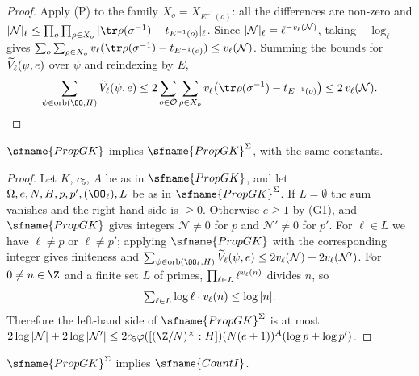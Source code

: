 \begin{proof}
Apply (P) to the family $X_o=X_{E^{-1}(o)}$: all the differences are non-zero and
$|\mathcal N|_\ell\le\prod_o\prod_{\rho\in X_o}|\tr\rho(\sigma^{-1})-t_{E^{-1}(o)}|_\ell$. Since $|\mathcal N|_\ell=\ell^{-v_\ell(\mathcal N)}$, taking
$-\log_\ell$ gives $\sum_o\sum_{\rho\in X_o}\eisv(\tr\rho(\sigma^{-1})-t_{E^{-1}(o)})\le\eisv(\mathcal N)$. Summing the bounds for
$\widetilde V_\ell(\psi,e)$ over $\psi$ and reindexing by $E$,
\[
 \sum_{\psi\in\mathrm{orb}(\OO,H)}\eisVt_\ell(\psi,e)\le2\sum_{o\in\mathcal O}\sum_{\rho\in X_o}\eisv\bigl(\tr\rho(\sigma^{-1})-t_{E^{-1}(o)}\bigr)
 \le2\,\eisv(\mathcal N).\qedhere
\]
\end{proof}

\begin{proposition}\label{pf:eis:corGK}
$\sfname{PropGK}$ implies $\sfname{PropGK}^{\Sigma}$, with the same constants.
\end{proposition}

\begin{proof}
Let $K$, $c_5$, $A$ be as in $\sfname{PropGK}$, and let $\Omega,e,N,H,p,p',(\OO_\ell),L$ be as in $\sfname{PropGK}^{\Sigma}$. If $L=\emptyset$ the sum
vanishes and the right-hand side is $\ge0$. Otherwise $e\ge1$ by (G1), and $\sfname{PropGK}$ gives integers $\mathcal N\ne0$ for
$p$ and $\mathcal N'\ne0$ for $p'$. For $\ell\in L$ we have $\ell\ne p$ or $\ell\ne p'$; applying $\sfname{PropGK}$ with the
corresponding integer gives finiteness and
$\sum_{\psi\in\mathrm{orb}(\OO_\ell,H)}\eisVt_\ell(\psi,e)\le2\eisv(\mathcal N)+2\eisv(\mathcal N')$. For $0\ne n\in\Z$ and a finite set $L$ of
primes, $\prod_{\ell\in L}\ell^{v_\ell(n)}$ divides $n$, so
\begin{equation}\label{pf:eis:sumlog}
\textstyle\sum_{\ell\in L}\log\ell\cdot v_\ell(n)\le\log|n|.
\end{equation}
Therefore the left-hand side of $\sfname{PropGK}^{\Sigma}$ is at most
$2\log|\mathcal N|+2\log|\mathcal N'|\le2c_5\varphi([(\Z/N)^\times:H])(N(e+1))^A(\log p+\log p')$.
\end{proof}

\begin{proposition}\label{pf:eis:countIcor}
$\sfname{PropGK}^{\Sigma}$ implies $\sfname{CountI}$.
\end{proposition}

